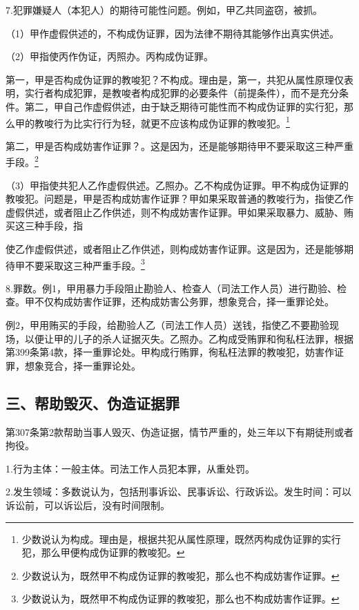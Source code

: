 7.犯罪嫌疑人（本犯人）的期待可能性问题。例如，甲乙共同盗窃，被抓。

（1）甲作虚假供述的，不构成伪证罪，因为法律不期待其能够作出真实供述。

（2）甲指使丙作伪证，丙照办。丙构成伪证罪。

第一，甲是否构成伪证罪的教唆犯？不构成。理由是，第一，共犯从属性原理仅表明，实行者构成犯罪，是教唆者构成犯罪的必要条件（前提条件），而不是充分条件。第二，甲自己作虚假供述，由于缺乏期待可能性而不构成伪证罪的实行犯，那么甲的教唆行为比实行行为轻，就更不应该构成伪证罪的教唆犯。\footnote{少数说认为构成。理由是，根据共犯从属性原理，既然丙构成伪证罪的实行犯，那么甲便构成伪证罪的教唆犯。}

第二，甲是否构成妨害作证罪？。这是因为，还是能够期待甲不要采取这三种严重手段。\footnote{少数说认为，既然甲不构成伪证罪的教唆犯，那么也不构成妨害作证罪。}

（3）甲指使共犯人乙作虚假供述。乙照办。乙不构成伪证罪。甲不构成伪证罪的教唆犯。问题是，甲是否构成妨害作证罪？甲如果采取普通的教唆行为，指使乙作虚假供述，或者阻止乙作供述，则不构成妨害作证罪。甲如果采取暴力、威胁、贿买这三种手段，指

使乙作虚假供述，或者阻止乙作供述，则构成妨害作证罪。这是因为，还是能够期待甲不要采取这三种严重手段。\footnote{少数说认为，既然甲不构成伪证罪的教唆犯，那么也不构成妨害作证罪。}

8.罪数。例1，甲用暴力手段阻止勘验人、检查人（司法工作人员）进行勘验、检查。甲不仅构成妨害作证罪，还构成妨害公务罪，想象竞合，择一重罪论处。

例2，甲用贿买的手段，给勘验人乙（司法工作人员）送钱，指使乙不要勘验现场，以便让甲的儿子的杀人证据灭失。乙照办。乙构成受贿罪和徇私枉法罪，根据第399条第4款，择一重罪论处。甲构成行贿罪，徇私枉法罪的教唆犯，妨害作证罪，想象竞合，择一重罪论处。

\subsection*{三、帮助毁灭、伪造证据罪}

第307条第2款帮助当事人毁灭、伪造证据，情节严重的，处三年以下有期徒刑或者拘役。

1.行为主体：一般主体。司法工作人员犯本罪，从重处罚。

2.发生领域：多数说认为，包括刑事诉讼、民事诉讼、行政诉讼。发生时间：可以诉讼前，可以诉讼后，没有时间限制。

